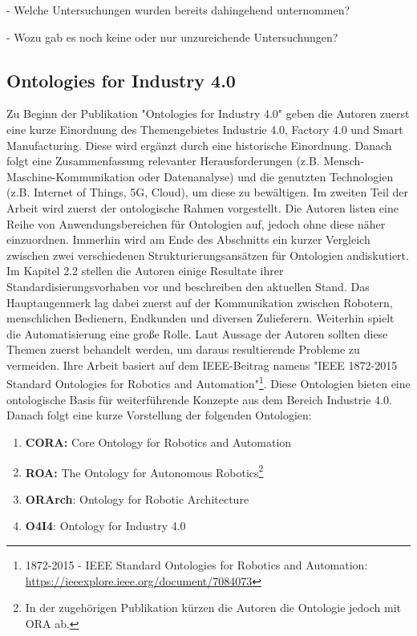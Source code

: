 \documentclass{article}
\begin{document}
- Welche Untersuchungen wurden bereits dahingehend unternommen?

- Wozu gab es noch keine oder nur unzureichende Untersuchungen?

\subsection{Ontologies for Industry 4.0}
%

Zu Beginn der Publikation "Ontologies for Industry 4.0" \cite{kumar2019ontologies} geben die Autoren zuerst eine kurze Einordnung des Themengebietes Industrie 4.0, Factory 4.0 und Smart Manufacturing.
Diese wird ergänzt durch eine historische Einordnung.
Danach folgt eine Zusammenfassung relevanter Herausforderungen (z.B. Mensch-Maschine-Kommunikation oder Datenanalyse) und die genutzten Technologien (z.B. Internet of Things, 5G, Cloud), um diese zu bewältigen.
Im zweiten Teil der Arbeit wird zuerst der ontologische Rahmen vorgestellt.
Die Autoren listen eine Reihe von Anwendungsbereichen für Ontologien auf, jedoch ohne diese näher einzuordnen.
Immerhin wird am Ende des Abschnitts ein kurzer Vergleich zwischen zwei verschiedenen Strukturierungsansätzen für Ontologien andiskutiert.
Im Kapitel 2.2 stellen die Autoren einige Resultate ihrer Standardisierungsvorhaben vor und beschreiben den aktuellen Stand.
Das Hauptaugenmerk lag dabei zuerst auf der Kommunikation zwischen Robotern, menschlichen Bedienern, Endkunden und diversen Zulieferern.
Weiterhin spielt die Automatisierung eine große Rolle.
Laut Aussage der Autoren sollten diese Themen zuerst behandelt werden, um daraus resultierende Probleme zu vermeiden.
Ihre Arbeit basiert auf dem IEEE-Beitrag namens "IEEE 1872-2015 Standard Ontologies for Robotics and Automation"\footnote{1872-2015 - IEEE Standard Ontologies for Robotics and Automation: \url{https://ieeexplore.ieee.org/document/7084073}}.
Diese Ontologien bieten eine ontologische Basis für weiterführende Konzepte aus dem Bereich Industrie 4.0.
Danach folgt eine kurze Vorstellung der folgenden Ontologien:
\begin{enumerate}
    \item \textbf{CORA:} Core Ontology for Robotics and Automation
    \item \textbf{ROA:} The Ontology for Autonomous Robotics\footnote{In der zugehörigen Publikation\cite{olszewska2017ontology} kürzen die Autoren die Ontologie jedoch mit ORA ab.}
    \item \textbf{ORArch}: Ontology for Robotic Architecture
    \item \textbf{O4I4}: Ontology for Industry 4.0
\end{enumerate}
\end{document}

